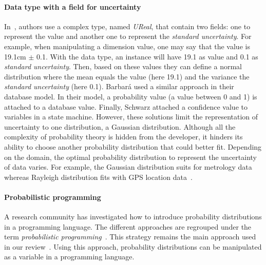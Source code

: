 \paragraph{Data type with a field for uncertainty}
In~\cite{DBLP:conf/models/BurguenoBMV18, DBLP:conf/ecmdafa/BertoaMBBTV18, DBLP:conf/sle/MayerhoferWV16, DBLP:conf/quatic/VallecilloMO16}, authors use a complex type, named \textit{UReal}, that contain two fields: one to represent the value and another one to represent the \textit{standard uncertainty}.
For example, when manipulating a dimension value, one may say that the value is 19.1cm $\pm$ 0.1. 
With the data type, an instance will have 19.1 as value and 0.1 as \textit{standard uncertainty}.
Then, based on these values they can define a normal distribution where the mean equals the value (here 19.1) and the variance the \textit{standard uncertainty} (here 0.1).
Barbará \etal \cite{DBLP:journals/tkde/BarbaraGP92} used a similar approach in their database model.
In their model, a probability value (a value between 0 and 1) is attached to a database value.
Finally, Schwarz \etal \cite{DBLP:conf/uist/SchwarzMH11} attached a confidence value to variables in a state machine.
However, these solutions limit the representation of uncertainty to one distribution, \eg a Gaussian distribution.
Although all the complexity of probability theory is hidden from the developer, it hinders its ability to choose another probability distribution that could better fit.
Depending on the domain, the optimal probability distribution to represent the uncertainty of data varies. 
For example, the Gaussian distribution suits for metrology data~\cite{metrology2008evaluation} whereas Rayleigh distribution fits with GPS location data~\cite{bornholt2013abstractions}.

\paragraph{Probabilistic programming}
A research community has investigated how to introduce probability distributions in a programming language.
The different approaches are regrouped under the term \textit{probabilistic programming}~\cite{DBLP:conf/icse/GordonHNR14}.
This strategy remains the main approach used in our review~\cite{baudin2017openturns, DBLP:conf/asplos/BornholtMM14, DBLP:journals/corr/BorgstromGGMG13, osti_1430202, DBLP:journals/peerj-cs/SalvatierWF16, DBLP:conf/popl/BhatAVG12, DBLP:conf/aistats/ChagantyNR13, DBLP:journals/siamsc/JaroszewiczK12, DBLP:journals/toplas/ParkPT08, DBLP:conf/ijcai/Pfeffer01, DBLP:conf/popl/RamseyP02, DBLP:conf/pldi/SankaranarayananCG13, DBLP:conf/icra/Thrun00, DBLP:journals/sac/LunnTBS00, plummer2003jags}.
Using this approach, probability distributions can be manipulated as a variable in a programming language.

